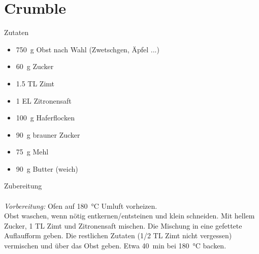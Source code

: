 \section*{Crumble}
\ihead{}\ohead{}
\cfoot{}
{\Large Zutaten}
\begin{multicols}{2}
\begin{itemize}
    \item \SI{750}{g} Obst nach Wahl (Zwetschgen, Äpfel ...)
    \item \SI{60}{g} Zucker
    \item \num{1.5} TL Zimt
    \item \num{1} EL Zitronensaft
    \item \SI{100}{g} Haferflocken
    \item \SI{90}{g} brauner Zucker
    \item \SI{75}{g} Mehl
    \item \SI{90}{g} Butter (weich)
\end{itemize}
\end{multicols}
\noindent
{\Large Zubereitung}\\
\\
\textit{Vorbereitung:} Ofen auf \SI{180}{\celsius} Umluft vorheizen.\\
Obst waschen, wenn nötig entkernen/entsteinen und klein schneiden.
Mit hellem Zucker, \num{1} TL Zimt und Zitronensaft mischen.
Die Mischung in eine gefettete Auflaufform geben. 
Die restlichen Zutaten (\num{1/2} TL Zimt nicht vergessen) vermischen und über das Obst geben.
Etwa \SI{40}{min} bei \SI{180}{\celsius} backen.